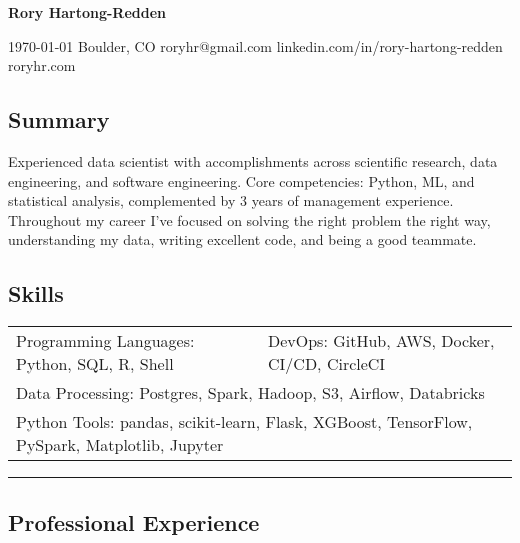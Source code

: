 \documentclass[10pt,letterpaper]{article}
\newenvironment{indentsection}[1]
{\begin{list}{}%
	{\setlength{\leftmargin}{#1}}
	\item[]%
}
{\end{list}}
\begin{document}
{\raggedright \LARGE \bf Rory Hartong-Redden}

{\raggedleft 
\today \/ \textbar
\/ Boulder, CO \textbar
\/ roryhr@gmail.com \textbar
\/ linkedin.com/in/rory-hartong-redden \textbar
\/ roryhr.com
\\
}


\subsection*{Summary}
\begin{centering}
Experienced data scientist with accomplishments across scientific research, data engineering, and software engineering. 
Core competencies: Python, ML, and statistical analysis, complemented by 3 years of management experience. 
Throughout my career I've focused on solving the right problem the right way, understanding my data, writing excellent code, and being a good teammate.
\end{centering}

\subsection*{Skills}

\begin{indentsection}{\parindent}
\begin{tabular}{p{0.5\linewidth}   p{0.5\linewidth}} 
	Programming Languages: Python, SQL, R, Shell
	& DevOps: GitHub, AWS, Docker,  CI/CD, CircleCI \\

	\multicolumn{2}{l}{Data Processing: Postgres, Spark, Hadoop, S3, Airflow, Databricks} \\
	\multicolumn{2}{l}{
		Python Tools: pandas, scikit-learn, Flask, XGBoost, TensorFlow, PySpark, Matplotlib, Jupyter
		}
\end{tabular}
\end{indentsection}

\hrule
\subsection*{Professional Experience}
\end{document}
